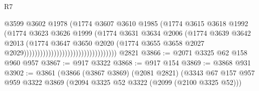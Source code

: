 \begin{lexlean}{R7}
\begin{coremodule}
                                                          @3599
                                                          @3602
                                                          @1978
                                                          (@1774
                                                            @3607
                                                            @3610
                                                            @1985
                                                            (@1774
                                                              @3615
                                                              @3618
                                                              @1992
                                                              (@1774
                                                                @3623
                                                                @3626
                                                                @1999
                                                                (@1774
                                                                  @3631
                                                                  @3634
                                                                  @2006
                                                                  (@1774
                                                                    @3639
                                                                    @3642
                                                                    @2013
                                                                    (@1774
                                                                      @3647
                                                                      @3650
                                                                      @2020
                                                                      (@1774
                                                                        @3655
                                                                        @3658
                                                                        @2027
                                                                        @2029))))))))))))))))))))))))))))))))))
    @2821
@3866 := @2071 @3325 @62 @158 @960 @957
@3867 := @917 @3322
@3868 := @917 @154
@3869 := @3868 @931
@3902 := @3861
    (@3866
      (@3867 @3869)
      (@2081 @2821)
      (@3343
        @67
        @157
        @957
        @959
        @3322
        @3869
        (@2094 @3325 @52 @3322 (@2099 (@2100 @3325 @52)))

\end{coremodule}
\end{lexlean}

